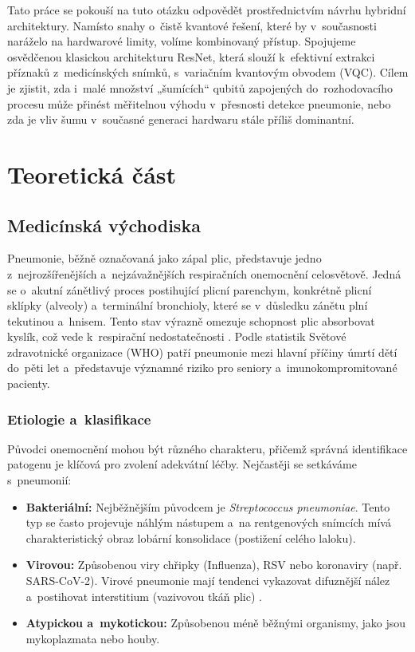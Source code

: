 \documentclass[12pt, a4paper]{report}
\begin{document}
Tato práce se pokouší na tuto otázku odpovědět prostřednictvím návrhu hybridní architektury.
Namísto snahy o~čistě kvantové řešení, které by v~současnosti naráželo na hardwarové limity, volíme kombinovaný přístup.
Spojujeme osvědčenou klasickou architekturu ResNet, která slouží k~efektivní extrakci příznaků z~medicínských snímků, s~variačním kvantovým obvodem (VQC).
Cílem je zjistit, zda i~malé množství „šumících“ qubitů zapojených do~rozhodovacího procesu může přinést měřitelnou výhodu v~přesnosti detekce pneumonie, nebo zda je vliv šumu v~současné generaci hardwaru stále příliš dominantní.

\chapter{Teoretická část} \label{chap:teorie}

\section{Medicínská východiska} \label{sec:medicina}

Pneumonie, běžně označovaná jako zápal plic, představuje jedno z~nejrozšířenějších a~nejzávažnějších respiračních onemocnění celosvětově.
Jedná se o~akutní zánětlivý proces postihující plicní parenchym, konkrétně plicní sklípky (alveoly) a~terminální bronchioly, které se v~důsledku zánětu plní tekutinou a~hnisem.
Tento stav výrazně omezuje schopnost plic absorbovat kyslík, což vede k~respirační nedostatečnosti \cite{who_pneumonia}.
Podle statistik Světové zdravotnické organizace (WHO) patří pneumonie mezi hlavní příčiny úmrtí dětí do~pěti let a~představuje významné riziko pro seniory a~imunokompromitované pacienty.

\subsection{Etiologie a~klasifikace}
Původci onemocnění mohou být různého charakteru, přičemž správná identifikace patogenu je klíčová pro zvolení adekvátní léčby.
Nejčastěji se setkáváme s~pneumonií:
\begin{itemize}
    \item \textbf{Bakteriální:} Nejběžnějším původcem je \textit{Streptococcus pneumoniae}.
    Tento typ se často projevuje náhlým nástupem a~na rentgenových snímcích mívá charakteristický obraz lobární konsolidace (postižení celého laloku).
    \item \textbf{Virovou:} Způsobenou viry chřipky (Influenza), RSV nebo koronaviry (např. SARS-CoV-2).
    Virové pneumonie mají tendenci vykazovat difuznější nález a~postihovat interstitium (vazivovou tkáň plic) \cite{radiology_viral_vs_bacterial}.
    \item \textbf{Atypickou a~mykotickou:} Způsobenou méně běžnými organismy, jako jsou mykoplazmata nebo houby.
\end{itemize}
\end{document}
